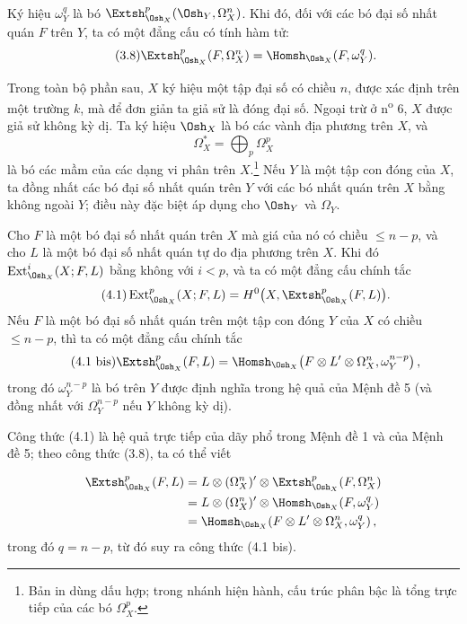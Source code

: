  Ký hiệu $\omega_Y^{q}$ là bó
$\Extsh_{\Osh_X}^{p}(\Osh_Y,\Omega_X^{n})$. Khi đó, đối với các bó đại số
nhất quán $F$ trên $Y$, ta có một đẳng cấu có tính hàm tử:
\begin{equation}\tag{3.8}
  \Extsh_{\Osh_X}^{p}(F,\Omega_X^{n})
  =\Homsh_{\Osh_X}(F,\omega_Y^{q}).
\end{equation}


Trong toàn bộ phần sau, $X$ ký hiệu một tập đại số có chiều $n$, được xác định
trên một trường $k$, mà để đơn giản ta giả sử là đóng đại số. Ngoại trừ
ở n\textsuperscript{o} 6, $X$ được giả sử không kỳ dị. Ta ký hiệu
$\Osh_X$ là bó các vành địa phương trên $X$, và
\[
  \Omega_X^{*}=\bigoplus_p\Omega_X^{p}
\]
là bó các mầm của các dạng vi phân trên $X$.\footnote{Bản in dùng
dấu hợp; trong nhánh hiện hành, cấu trúc phân bậc là tổng trực tiếp
của các bó $\Omega_X^p$.} Nếu $Y$ là một tập con đóng của $X$, ta đồng nhất
các bó đại số nhất quán trên $Y$ với các bó nhất quán trên $X$
bằng không ngoài $Y$; điều này đặc biệt áp dụng cho $\Osh_Y$ và $\Omega_Y$.

 Cho $F$ là một bó đại số nhất quán trên $X$ mà
giá của nó có chiều $\leq n-p$, và cho $L$ là một bó đại số nhất quán
tự do địa phương trên $X$. Khi đó $\operatorname{Ext}_{\Osh_X}^{i}(X;F,L)$ bằng không
với $i<p$, và ta có một đẳng cấu chính tắc
\begin{equation}\tag{4.1}
  \operatorname{Ext}_{\Osh_X}^{p}(X;F,L)
  =H^{0}\bigl(X,\Extsh_{\Osh_X}^{p}(F,L)\bigr).
\end{equation}
Nếu $F$ là một bó đại số nhất quán trên một tập con đóng $Y$ của $X$ có
chiều $\leq n-p$, thì ta có một đẳng cấu chính tắc
\begin{equation}\tag{4.1 bis}
  \Extsh_{\Osh_X}^{p}(F,L)
  =\Homsh_{\Osh_X}\!\left(
    F\otimes L'\otimes\Omega_X^{n},\omega_Y^{n-p}
  \right),
\end{equation}
trong đó $\omega_Y^{n-p}$ là bó trên $Y$ được định nghĩa trong hệ quả của
Mệnh đề 5 (và đồng nhất với $\Omega_Y^{n-p}$ nếu $Y$ không kỳ dị).

Công thức (4.1) là hệ quả trực tiếp của dãy phổ trong
Mệnh đề 1 và của Mệnh đề 5; theo công thức (3.8), ta có thể
viết

\begin{align*}
\Extsh_{\Osh_X}^{p}(F,L)
&=L\otimes(\Omega_X^{n})'\otimes
  \Extsh_{\Osh_X}^{p}(F,\Omega_X^{n})\\
&=L\otimes(\Omega_X^{n})'\otimes
  \Homsh_{\Osh_X}(F,\omega_Y^{q})\\
&=\Homsh_{\Osh_X}\!\left(
  F\otimes L'\otimes\Omega_X^{n},\omega_Y^{q}\right),
\end{align*}
trong đó $q=n-p$, từ đó suy ra công thức (4.1 bis).


